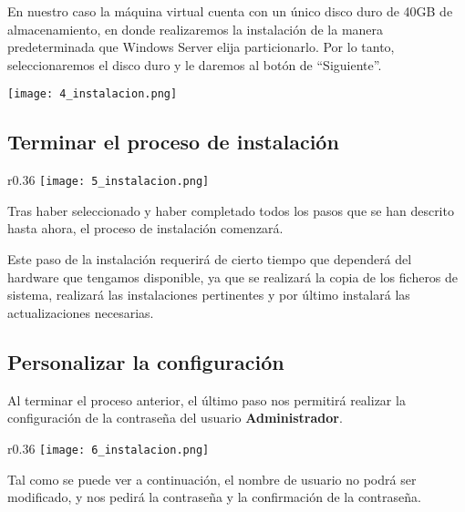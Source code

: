{
    \begin{minipage}{0.6\linewidth}
        \setlength{\parskip}{1.2em}
        En nuestro caso la máquina virtual cuenta con un único disco duro de 40GB de almacenamiento, en donde realizaremos la instalación de la manera predeterminada que Windows Server elija particionarlo. Por lo tanto, seleccionaremos el disco duro y le daremos al botón de “Siguiente”.
    \end{minipage}
    \hfill
    \begin{minipage}{0.36\linewidth}
        \vspace{-11pt}
        \texttt{[image: 4\_instalacion.png]}
    \end{minipage}
}


\subsection{Terminar el proceso de instalación}
\begin{wrapfigure}{r}{0.36\linewidth}
    \centering
    \vspace{-20pt}
    \texttt{[image: 5\_instalacion.png]}
\end{wrapfigure}
Tras haber seleccionado y haber completado todos los pasos que se han descrito hasta ahora, el proceso de instalación comenzará.

Este paso de la instalación requerirá de cierto tiempo que dependerá del hardware que tengamos disponible, ya que se realizará la copia de los ficheros de sistema, realizará las instalaciones pertinentes y por último instalará las actualizaciones necesarias.

\vspace{3em}

\subsection{Personalizar la configuración}
Al terminar el proceso anterior, el último paso nos permitirá realizar la configuración de la contraseña del usuario \textbf{Administrador}.



\begin{wrapfigure}{r}{0.36\linewidth}
    \centering
    \vspace{-40pt}
    \texttt{[image: 6\_instalacion.png]}
    \vspace{-40pt}
\end{wrapfigure}Tal como se puede ver a continuación, el nombre de usuario no podrá ser modificado, y nos pedirá la contraseña y la confirmación de la contraseña.


